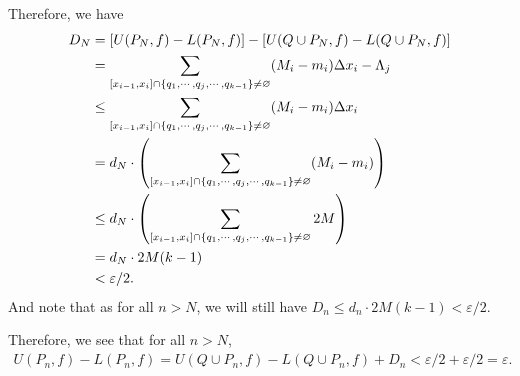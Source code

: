 \documentclass[12pt]{article}
\begin{document}
\begin{fproof}[4(a)]
    Therefore, we have
    \begin{align*}
      D_N &= \left[ U(P_N,f) - L(P_N, f) \right] - \left[ U(Q \cup P_N, f) - L(Q \cup P_N, f) \right]\\
      & = \sum_{[x_{i-1}, x_i] \cap \{q_1, \cdots, q_j, \cdots, q_{k-1}\} \neq \varnothing} (M_i - m_i) \Delta x_i - \Lambda_j\\
      & \leq \sum_{[x_{i-1}, x_i] \cap \{q_1, \cdots, q_j, \cdots, q_{k-1}\} \neq \varnothing} (M_i - m_i) \Delta x_i \\
      & = d_N \cdot \left( \sum_{[x_{i-1}, x_i] \cap \{q_1, \cdots, q_j, \cdots, q_{k-1}\} \neq \varnothing} (M_i - m_i) \right)\\
      & \leq d_N \cdot \left( \sum_{[x_{i-1}, x_i] \cap \{q_1, \cdots, q_j, \cdots, q_{k-1}\} \neq \varnothing} 2M \right)\\
      & = d_N \cdot 2M(k-1)\\
      & < \varepsilon/2.
    \end{align*}
    And note that as for all \(n > N\), we will still have \(D_n \leq d_n \cdot 2M(k-1) < \varepsilon/2\).
  
    Therefore, we see that for all \(n > N\),
    \begin{align*}
      U(P_n, f) - L(P_n,f) = U(Q \cup P_n, f) - L(Q \cup P_n, f) + D_n < \varepsilon/2 + \varepsilon/2 = \varepsilon.
    \end{align*}
\end{fproof}
\end{document}
